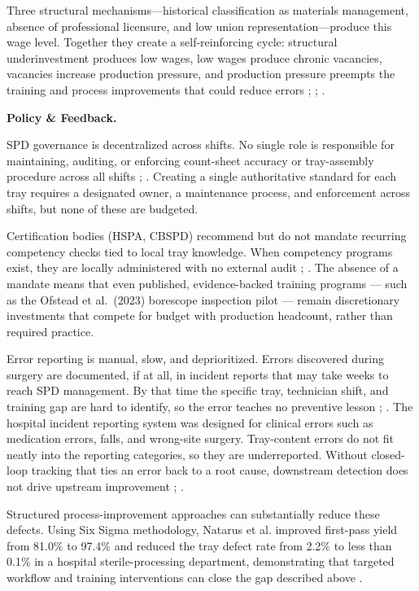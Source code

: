 \documentclass[10pt,a4paper]{article}
\begin{document}
Three structural mechanisms---historical classification as materials management,
absence of professional licensure, and low union representation---produce this
wage level. Together they create a self-reinforcing cycle: structural
underinvestment produces low wages, low wages produce chronic vacancies,
vacancies increase production pressure, and production pressure preempts the
training and process improvements that could reduce errors
\cite{evolved-sterile-processing-2025};
\cite{specialtycare-travel-spd-2026};
\cite{bls-union-2023}.

\textbf{Policy \& Feedback.}

SPD governance is decentralized across shifts. No single role is responsible for
maintaining, auditing, or enforcing count-sheet accuracy or tray-assembly
procedure across all shifts
\cite{nadeau-2024};
\cite{loria-2024}. Creating a single
authoritative standard for each tray requires a designated owner, a maintenance
process, and enforcement across shifts, but none of these are budgeted.

Certification bodies (HSPA, CBSPD) recommend but do not mandate recurring
competency checks tied to local tray knowledge. When competency programs exist,
they are locally administered with no external audit
\cite{kovach-2012};
\cite{ofstead-et-al-2023}.
The absence of a mandate means that even published, evidence-backed
training programs --- such as the Ofstead et al.\ (2023) borescope
inspection pilot --- remain discretionary investments that compete
for budget with production headcount, rather than required practice.

Error reporting is manual, slow, and deprioritized. Errors discovered during
surgery are documented, if at all, in incident reports that may take weeks to
reach SPD management. By that time the specific tray, technician shift, and
training gap are hard to identify, so the error teaches no preventive lesson
\cite{nichol-et-al-2024};
\cite{zhu-et-al-2019}. The hospital incident reporting
system was designed for clinical errors such as medication errors, falls, and
wrong-site surgery. Tray-content errors do not fit neatly into the reporting
categories, so they are underreported. Without closed-loop tracking that ties an
error back to a root cause, downstream detection does not drive upstream
improvement \cite{nichol-et-al-2024};
\cite{zhu-et-al-2019}.

Structured process-improvement approaches can substantially reduce these
defects. Using Six Sigma methodology, Natarus et al. improved first-pass yield
from 81.0\% to 97.4\% and reduced the tray defect rate from 2.2\% to less than
0.1\% in a hospital sterile-processing department, demonstrating that targeted
workflow and training interventions can close the gap described above
\cite{natarus-et-al-2025}.
\end{document}
